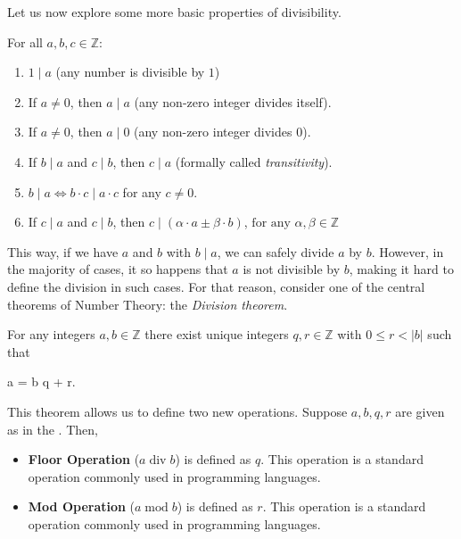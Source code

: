 \documentclass[../../book.tex]{subfiles}
\begin{document}
Let us now explore some more basic properties of divisibility. 

\begin{lemma}
    For all $a, b, c \in \mathbb{Z}$:
    \hfill
    \begin{enumerate}
        \item $1 \mid a$ (any number is divisible by $1$)
        \item If $a \neq 0$, then $a \mid a$ (any non-zero integer divides itself).
        \item If $a \neq 0$, then $a \mid 0$ (any non-zero integer divides $0$).
        \item If $b \mid a$ and $c \mid b$, then $c \mid a$ (formally called \emph{transitivity}).
        \item $b \mid a \iff b \cdot c \mid a \cdot c$ for any $c \neq 0$.
        \item If $c \mid a$ and $c \mid b$, then $c \mid (\alpha \cdot a \pm \beta \cdot b)$, $\text{for any } \alpha, \beta \in \mathbb{Z}$
    \end{enumerate}
\end{lemma}

This way, if we have $a$ and $b$ with $b \mid a$, we can safely divide $a$ by
$b$. However, in the majority of cases, it so happens that $a$ is not divisible
by $b$, making it hard to define the division in such cases. For that reason,
consider one of the central theorems of Number Theory: the \emph{Division
theorem}.

\begin{theorem}\label{th:division}
    For any integers $a,b \in \mathbb{Z}$ there exist unique integers $q, r \in \mathbb{Z}$ with $0 \leq r < |b|$ such that 
    \begin{xequation}
        a = b \cdot q + r.
    \end{xequation}
\end{theorem}

This theorem allows us to define two new operations. Suppose $a,b,q,r$ are given
as in the . Then,
\begin{itemize}
    \item \textbf{Floor Operation} ($a \; \text{div} \; b$) is defined
    as $q$. This operation is a standard  operation commonly used in programming languages.
    \item \textbf{Mod Operation} ($a \; \text{mod} \; b$) is defined as $r$. This operation is a standard
 operation commonly used in programming languages. 
\end{itemize}
\end{document}
